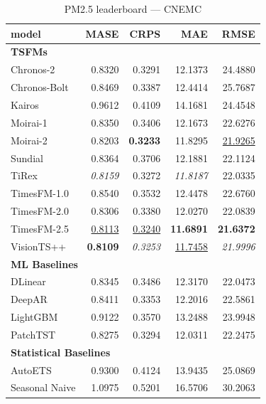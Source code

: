 \begin{table}[H]
\caption{PM2.5 leaderboard --- CNEMC}
\centering
\begin{small}
\begin{tabular}{lrrrr}
\toprule
model & MASE & CRPS & MAE & RMSE \\
\midrule
\multicolumn{5}{l}{\textbf{TSFMs}} \\
Chronos-2 & 0.8320 & 0.3291 & 12.1373 & 24.4880 \\
Chronos-Bolt & 0.8469 & 0.3387 & 12.4414 & 25.7687 \\
Kairos & 0.9612 & 0.4109 & 14.1681 & 24.4548 \\
Moirai-1 & 0.8350 & 0.3406 & 12.1673 & 22.6276 \\
Moirai-2 & 0.8203 & \textbf{0.3233} & 11.8295 & \underline{21.9265} \\
Sundial & 0.8364 & 0.3706 & 12.1881 & 22.1124 \\
TiRex & \textit{0.8159} & 0.3272 & \textit{11.8187} & 22.0335 \\
TimesFM-1.0 & 0.8540 & 0.3532 & 12.4478 & 22.6760 \\
TimesFM-2.0 & 0.8306 & 0.3380 & 12.0270 & 22.0839 \\
TimesFM-2.5 & \underline{0.8113} & \underline{0.3240} & \textbf{11.6891} & \textbf{21.6372} \\
VisionTS++ & \textbf{0.8109} & \textit{0.3253} & \underline{11.7458} & \textit{21.9996} \\
\midrule
\multicolumn{5}{l}{\textbf{ML Baselines}} \\
DLinear & 0.8345 & 0.3486 & 12.3170 & 22.0473 \\
DeepAR & 0.8411 & 0.3353 & 12.2016 & 22.5861 \\
LightGBM & 0.9122 & 0.3570 & 13.2488 & 23.9948 \\
PatchTST & 0.8275 & 0.3294 & 12.0311 & 22.2475 \\
\midrule
\multicolumn{5}{l}{\textbf{Statistical Baselines}} \\
AutoETS & 0.9300 & 0.4124 & 13.9435 & 25.0869 \\
Seasonal Naive & 1.0975 & 0.5201 & 16.5706 & 30.2063 \\
\bottomrule
\end{tabular}
\end{small}
\end{table}